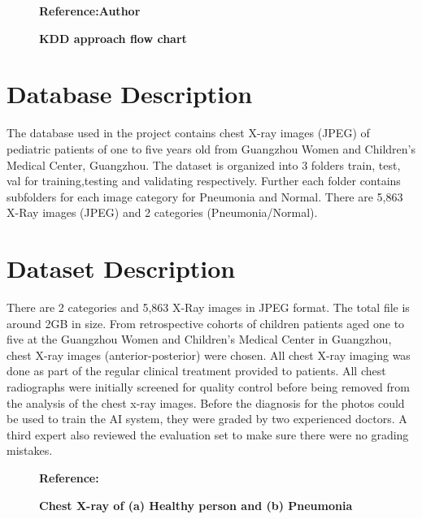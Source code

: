 
\begin{figure}
	\centering
	\caption{\textbf{KDD approach flow chart}}
	\footnotesize \textbf{Reference:Author}
	\label{fig:KDD Approach}
\end{figure}

\bigskip

\section{Database Description}

The database used in the project contains chest X-ray images (JPEG) of pediatric patients of one to five years old from Guangzhou Women and Children’s Medical Center, Guangzhou. The dataset is organized into 3 folders train, test, val for training,testing and validating respectively. Further each folder contains subfolders for each image category for Pneumonia and Normal. There are 5,863 X-Ray images (JPEG) and 2 categories (Pneumonia/Normal).\cite{Wang:2017}

 
 \bigskip
 
 \section{Dataset Description}
 
There are 2 categories and 5,863 X-Ray images in JPEG format. The total file is around 2GB in size. From retrospective cohorts of children patients aged one to five at the Guangzhou Women and Children's Medical Center in Guangzhou, chest X-ray images (anterior-posterior) were chosen. All chest X-ray imaging was done as part of the regular clinical treatment provided to patients. All chest radiographs were initially screened for quality control before being removed from the analysis of the chest x-ray images. Before the diagnosis for the photos could be used to train the AI system, they were graded by two experienced doctors. A third expert also reviewed the evaluation set to make sure there were no grading mistakes.

\begin{figure}
	\centering
	\caption{\textbf{Chest X-ray of (a) Healthy person and (b) Pneumonia}}
	\footnotesize \textbf{Reference:}\cite{Firdiantika:2022}
	\label{fig:Chest X-ray images of healthy person and person having pneumonia}
\end{figure}


